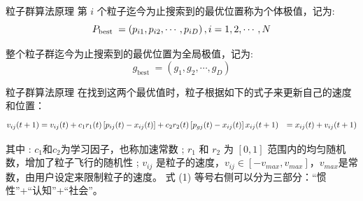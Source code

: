 \documentclass[xcolor=table,dvipsnames,svgnames,aspectratio=169,fontset=ubuntu]{ctexbeamer}
\let\\\relax
\let\quad\relax
\begin{document}
\begin{frame}{粒子群算法原理}
  第 $i$ 个粒子迄今为止搜索到的最优位置称为个体极值，记为:
$$
P_{\text {best }}=\left(p_{i 1}, p_{i 2}, \cdots, p_{i D}\right), \quad i=1,2, \cdots, N
$$

整个粒子群迄今为止搜索到的最优位置为全局极值，记为:
$$
g_{\text {best }}=\left(g_1, g_2, \cdots, g_D\right)
$$
\end{frame}

\begin{frame}{粒子群算法原理}
  在找到这两个最优值时，粒子根据如下的式子来更新自己的速度和位置：
$$
\begin{aligned}
  v_{i j}(t+1)&=v_{i j}(t)+c_1 r_1(t)\left[p_{i j}(t)-x_{i j}(t)\right]+c_2 r_2(t)\left[p_{g j}(t)-x_{i j}(t)\right] \\
  x_{i j}(t+1)&=x_{i j}(t)+v_{i j}(t+1)\\
\end{aligned}
$$

其中 : $c_1$和$c_2$为学习因子，也称加速常数 ; $r_1$ 和 $r_2$ 为 $[0,1]$ 范围内的均匀随机数，增加了粒子飞行的随机性 ; $v _{i j}$ 是粒子的速度，$v_{ij} \in [-v_{max}, v_{max}]$，$v_{max}$是常数，由用户设定来限制粒子的速度。
\vskip 10pt
式 (1) 等号右侧可以分为三部分：“惯性”+“认知”+“社会”。
\end{frame}
\end{document}
